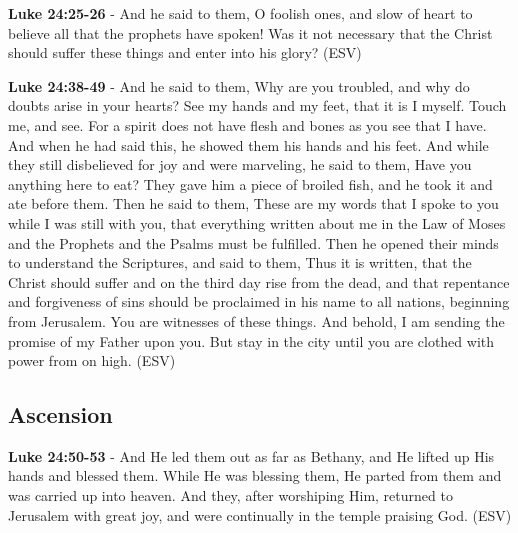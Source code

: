 \documentclass[11pt]{article}
\begin{document}
\textbf{Luke 24:25-26} - And he said to them, O foolish ones, and slow of heart to believe all that the prophets have spoken! Was it not necessary that the Christ should suffer these things and enter into his glory? (ESV)

\textbf{Luke 24:38-49} - And he said to them, Why are you troubled, and why do doubts arise in your hearts? See my hands and my feet, that it is I myself. Touch me, and see. For a spirit does not have flesh and bones as you see that I have. And when he had said this, he showed them his hands and his feet. And while they still disbelieved for joy and were marveling, he said to them, Have you anything here to eat? They gave him a piece of broiled fish, and he took it and ate before them. Then he said to them, These are my words that I spoke to you while I was still with you, that everything written about me in the Law of Moses and the Prophets and the Psalms must be fulfilled. Then he opened their minds to understand the Scriptures, and said to them, Thus it is written, that the Christ should suffer and on the third day rise from the dead, and that repentance and forgiveness of sins should be proclaimed in his name to all nations, beginning from Jerusalem. You are witnesses of these things. And behold, I am sending the promise of my Father upon you. But stay in the city until you are clothed with power from on high. (ESV)

\subsection{Ascension}
\label{sec:org67d3e67}
\textbf{Luke 24:50-53} - And He led them out as far as Bethany, and He lifted up His hands and blessed them. While He was blessing them, He parted from them and was carried up into heaven. And they, after worshiping Him, returned to Jerusalem with great joy, and were continually in the temple praising God. (ESV)
\end{document}
